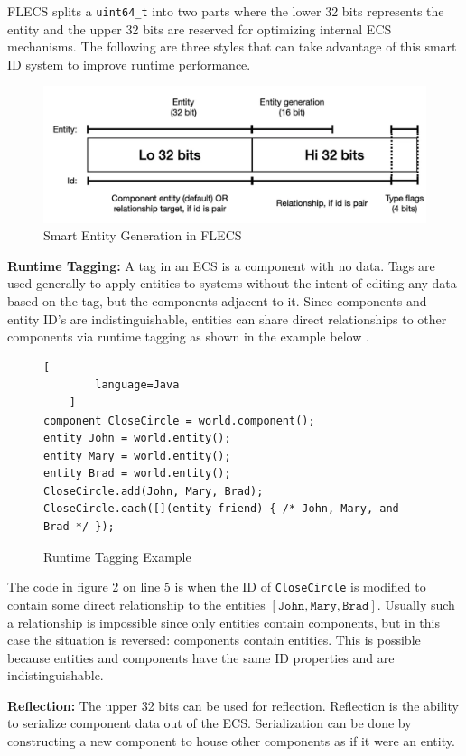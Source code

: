 FLECS splits a \texttt{uint64\_t} into two parts where the lower 32 bits represents the entity and the upper 32 bits are reserved for optimizing internal ECS mechanisms. The following are three styles that can take advantage of this smart ID system to improve runtime performance.

\begin{figure}[H]
    \centering
    \includegraphics[width=0.5\linewidth]{resources/entity_generation.png}
    \caption{Smart Entity Generation in FLECS}
    \label{fig:entity_generation}
\end{figure}

\textbf{Runtime Tagging:}
A tag in an ECS is a component with no data. Tags are used generally to apply entities to systems without the intent of editing any data based on the tag, but the components adjacent to it. Since components and entity ID's are indistinguishable, entities can share direct relationships to other components via runtime tagging as shown in the example below \cite{RomeoPHD}.

\begin{figure}[H]
    \begin{lstlisting}[
        language=Java
    ]
component CloseCircle = world.component();
entity John = world.entity();
entity Mary = world.entity();
entity Brad = world.entity();
CloseCircle.add(John, Mary, Brad);
CloseCircle.each([](entity friend) { /* John, Mary, and Brad */ });
\end{lstlisting}
    \caption{Runtime Tagging Example}
    \label{code:runtime_tagging}
\end{figure}

The code in figure \ref{code:runtime_tagging} on line 5 is when the ID of \texttt{CloseCircle} is modified to contain some direct relationship to the entities $[\texttt{John}, \texttt{Mary}, \texttt{Brad}]$. Usually such a relationship is impossible since only entities contain components, but in this case the situation is reversed: components contain entities. This is possible because entities and components have the same ID properties and are indistinguishable.

\textbf{Reflection:}
The upper 32 bits can be used for reflection. Reflection is the ability to serialize component data out of the ECS. Serialization can be done by constructing a new component to house other components as if it were an entity.

